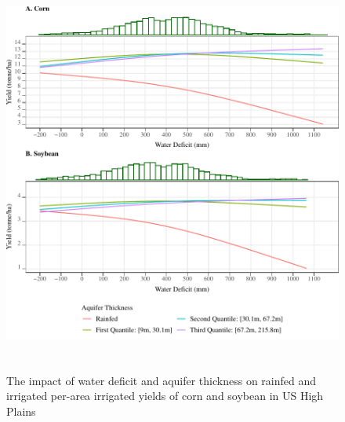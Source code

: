 \documentclass[
]{article}
\begin{document}
\begin{figure}[H]

{\centering \includegraphics[width=6.5in,height=500px,]{Figures/g_yield_intensive} 

}

\caption{The impact of water deficit and aquifer thickness on rainfed and irrigated per-area irrigated yields of corn and soybean in US High Plains}\label{fig:yield-response}
\end{figure}
\end{document}
